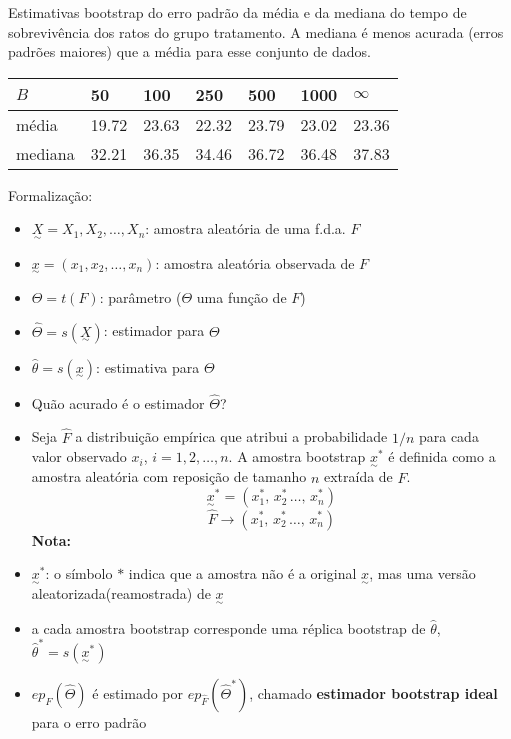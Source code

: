 \documentclass[
  letterpaper,
  DIV=11,
  numbers=noendperiod]{scrreprt}
\begin{document}
Estimativas bootstrap do erro padrão da média e da mediana do tempo de
sobrevivência dos ratos do grupo tratamento. A mediana é menos acurada
(erros padrões maiores) que a média para esse conjunto de dados.

\begin{longtable}[]{@{}lllllll@{}}
\toprule\noalign{}
\(B\) & 50 & 100 & 250 & 500 & 1000 & \(\infty\) \\
\midrule\noalign{}
\endhead
\bottomrule\noalign{}
\endlastfoot
média & 19.72 & 23.63 & 22.32 & 23.79 & 23.02 & 23.36 \\
mediana & 32.21 & 36.35 & 34.46 & 36.72 & 36.48 & 37.83 \\
\end{longtable}

Formalização:

\begin{itemize}
\item
  \(\underset{\sim}{X} = X_1, X_2,\dots, X_n\): amostra aleatória de uma
  f.d.a. \(F\)
\item
  \(\underset{\sim}{x} = (x_1, x_2,\ldots, x_n)\): amostra aleatória
  observada de \(F\)
\item
  \(\Theta=t(F)\): parâmetro (\(\Theta\) uma função de \(F\))
\item
  \(\hat{\Theta}=s(\underset{\sim}{X})\): estimador para \(\Theta\)
\item
  \(\hat{\theta}=s(\underset{\sim}{x})\): estimativa para \(\Theta\)
\item
  Quão acurado é o estimador \(\hat{\Theta}\)?
\item
  Seja \(\hat{F}\) a distribuição empírica que atribui a probabilidade
  \(1/n\) para cada valor observado \(x_i\), \(i=1,2,\ldots, n\). A
  amostra bootstrap \(\underset{\sim}{x}^*\) é definida como a amostra
  aleatória com reposição de tamanho \(n\) extraída de \(\hat{F}\).
  \[\underset{\sim}{x}^*=(x_1^*,\,x_2^*\,\ldots,\,x_n^*)\]
  \[\hat{F}\longrightarrow (x_1^*,\,x_2^*\,\ldots,\,x_n^*)\]
  \textbf{Nota:}
\item
  \(\underset{\sim}{x}^*\): o símbolo \(*\) indica que a amostra não é a
  original \(\underset{\sim}{x}\), mas uma versão
  aleatorizada(reamostrada) de \(\underset{\sim}{x}\)
\item
  a cada amostra bootstrap corresponde uma réplica bootstrap de
  \(\hat\theta\), \(\hat\theta^* =s(\underset{\sim}{x}^*)\)
\item
  \(ep_F(\hat\Theta)\) é estimado por \(ep_{\hat{F}}(\hat\Theta^*)\),
  chamado \textbf{estimador bootstrap ideal} para o erro padrão

\end{itemize}
\end{document}
